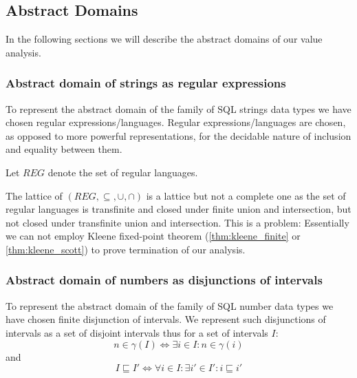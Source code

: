 \subsection{Abstract Domains}\label{subsec:abstract-domains}

In the following sections we will describe the abstract domains of our value analysis.

\subsubsection{Abstract domain of strings as regular expressions}\label{subsubsec:abstract_domains_strings}

To represent the abstract domain of the family of SQL strings data types we have chosen regular expressions/languages.
Regular expressions/languages are chosen, as opposed to more powerful representations, for the decidable nature of inclusion and equality between them.

Let $REG$ denote the set of regular languages. %

The lattice of $(REG, \subseteq, \cup, \cap)$ is a lattice but not a complete one as the set of regular languages is transfinite and closed under finite union and intersection, but not closed under transfinite union and intersection.
This is a problem: Essentially we can not employ Kleene fixed-point theorem (\autoref{thm:kleene_finite} or \autoref{thm:kleene_scott}) to prove termination of our analysis.

\subsubsection{Abstract domain of numbers as disjunctions of intervals}\label{subsubsec:abstract_domains_numbers}

To represent the abstract domain of the family of SQL number data types we have chosen finite disjunction of intervals.
We represent such disjunctions of intervals as a set of disjoint intervals thus for a set of intervals $I$:
\begin{equation}
    n \in \gamma(I) \iff \exists i \in I : n \in \gamma(i)
\end{equation}
and
\begin{equation}
    I \sqsubseteq I' \iff \forall i \in I : \exists i' \in I' : i \sqsubseteq i'
\end{equation}

